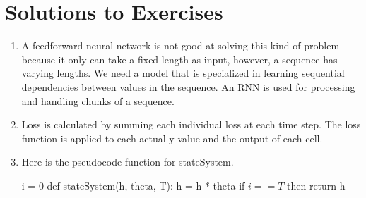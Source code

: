 \section{Solutions to Exercises}

\begin{enumerate}
    \item  A feedforward neural network is not good at solving this kind of problem because it only can take a fixed length as input, however, a sequence has varying lengths. We need a model that is specialized in learning sequential dependencies between values in the sequence. An RNN is used for processing and handling chunks of a sequence.

    \item  Loss is calculated by summing each individual loss at each time step. The loss function is applied to each actual y value and the output of each cell.  

    \item Here is the pseudocode function for stateSystem.\\

    \begin{algorithm}
    \caption{$stateSystem(\textbf{h},theta, T)$}
    \begin{algorithmic}[1]
        \State i = 0
        \State def stateSystem(h, theta, T):
            \State \indent h = h * theta
            \State \indent if $i == T$ then
		\State  \indent \indent return h
            
	\end{algorithmic} 
\end{algorithm}
   


\end{enumerate}

